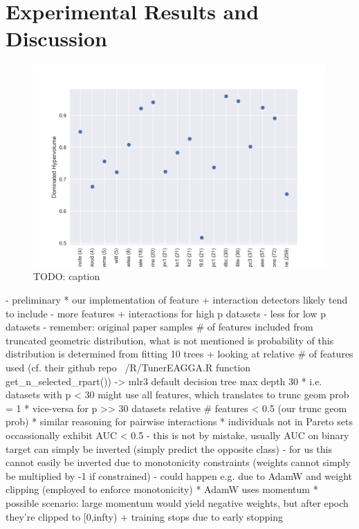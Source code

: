 \documentclass[twoside,11pt]{article}
\begin{document}
\section{Experimental Results and Discussion}
\begin{figure}
  \centering
  \includegraphics[width=0.9\linewidth]{../code/export/plot_test_dhvs.png}
  \caption{TODO: caption}
  \label{fig-test-dhvs}
\end{figure}
- preliminary
  * our implementation of feature + interaction detectors likely tend to include  %
    - more features + interactions for high p datasets
    - less for low p datasets
    - remember: original paper samples \# of features included from truncated geometric distribution, what is not mentioned is probability of this distribution
      is determined from fitting 10 trees + looking at relative \# of features used (cf. their github repo ~/R/TunerEAGGA.R function get\_n\_selected\_rpart())
    -> mlr3 default decision tree max depth 30
      * i.e. datasets with p < 30 might use all features, which translates to trunc geom prob = 1
      * vice-versa for p >> 30 datasets relative \# features < 0.5 (our trunc geom prob)
      * similar reasoning for pairwise interactions
  * individuals not in Pareto sets occassionally exhibit AUC < 0.5
    - this is not by mistake, usually AUC on binary target can simply be inverted (simply predict the opposite class)
    - for us this cannot easily be inverted due to monotonicity constraints (weights cannot simply be multiplied by -1 if constrained)
    - could happen e.g. due to AdamW and weight clipping (employed to enforce monotonicity)
      * AdamW uses momentum
      * possible scenario: large momentum would yield negative weights, but after epoch they're clipped to [0,infty) + training stops due to early stopping
\end{document}
